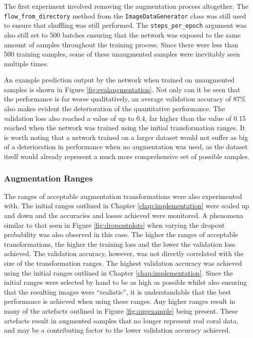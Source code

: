 The first experiment involved removing the augmentation process altogether. The \texttt{flow\_from\_directory} method from the \texttt{ImageDataGenerator} class was still used to ensure that shuffling was still performed. The \texttt{steps\_per\_epoch} argument was also still set to 500 batches ensuring that the network was exposed to the same amount of samples throughout the training process. Since there were less than 500 training samples, some of these unaugmented samples were inevitably seen multiple times.

An example prediction output by the network when trained on unaugmented samples is shown in Figure \ref{fig:evalaugmentation}. Not only can it be seen that the performance is far worse qualitatively, an average validation accuracy of 87\% also makes evident the deterioration of the quantitative performance. The validation loss also reached a value of up to 0.4, far higher than the value of 0.15 reached when the network was trained using the initial transformation ranges. It is worth noting that a network trained on a larger dataset would not suffer as big of a deterioration in performance when no augmentation was used, as the dataset itself would already represent a much more comprehensive set of possible samples.

\subsubsection{Augmentation Ranges}

The ranges of acceptable augmentation transformations were also experimented with. The initial ranges outlined in Chapter \ref{chap:implementation} were scaled up and down and the accuracies and losses achieved were monitored. A phenomena similar to that seen in Figure \ref{fig:dropoutplots} when varying the dropout probability was also observed in this case. The higher the ranges of acceptable transformations, the higher the training loss and the lower the validation loss achieved. The validation accuracy, however, was not directly correlated with the size of the transformation ranges. The highest validation accuracy was achieved using the initial ranges outlined in Chapter \ref{chap:implementation}. Since the initial ranges were selected by hand to be as high as possible whilst also ensuring that the resulting images were ``realistic'', it is understandable that the best performance is achieved when using these ranges. Any higher ranges result in many of the artefacts outlined in Figure \ref{fig:augexample} being present. These artefacts result in augmented samples that no longer represent real coral data, and may be a contributing factor to the lower validation accuracy achieved.

